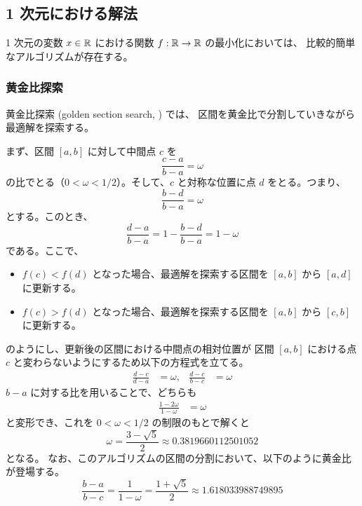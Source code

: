 %

\subsection{1 次元における解法}

1 次元の変数 $x \in \mathbb{R}$ における関数 $f : \mathbb{R} \to \mathbb{R}$ の最小化においては、
比較的簡単なアルゴリズムが存在する。

\subsubsection{黄金比探索}

黄金比探索 (golden section search, \cite[10.2]{Press2007}) では、
区間を黄金比で分割していきながら最適解を探索する。

まず、区間 $[a,b]$ に対して中間点 $c$ を
\begin{equation}
    \frac{c - a}{b - a} = \omega
\end{equation}
の比でとる（$0 < \omega < 1/2$）。そして、$c$ と対称な位置に点 $d$ をとる。つまり、
\begin{equation}
    \frac{b - d}{b - a} = \omega
\end{equation}
とする。このとき、
\begin{equation}
    \frac{d - a}{b - a} = 1 - \frac{b - d}{b - a} = 1 - \omega
\end{equation}
である。ここで、
\begin{itemize}
    \item $f(c) < f(d)$ となった場合、最適解を探索する区間を $[a, b]$ から $[a, d]$ に更新する。
    \item $f(c) > f(d)$ となった場合、最適解を探索する区間を $[a, b]$ から $[c, b]$ に更新する。
\end{itemize}
のようにし、更新後の区間における中間点の相対位置が
区間 $[a, b]$ における点 $c$ と変わらないようにするため以下の方程式を立てる。
\begin{align}
    \frac{d - c}{d - a} &= \omega, &
    \frac{d - c}{b - c} &= \omega
\end{align}
$b - a$ に対する比を用いることで、どちらも
\begin{align}
    \frac{1 - 2\omega}{1 - \omega} &= \omega
\end{align}
と変形でき、これを $0 < \omega < 1/2$ の制限のもとで解くと
\begin{equation}
    \omega = \frac{3 - \sqrt{5}}{2} \approx 0.3819660112501052
\end{equation}
となる。
なお、このアルゴリズムの区間の分割において、以下のように黄金比が登場する。
\begin{equation}
    \frac{b - a}{b - c} = \frac{1}{1 - \omega} = \frac{1 + \sqrt{5}}{2} \approx 1.618033988749895
\end{equation}
